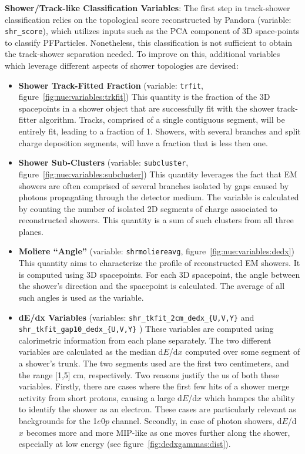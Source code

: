 \par \noindent \textbf{Shower/Track-like  Classification Variables}: The first step in track-shower classification relies on the topological score reconstructed by Pandora (variable: \texttt{shr\_score}), which utilizes inputs such as the PCA component of 3D space-points to classify PFParticles. Nonetheless, this classification is not sufficient to obtain the track-shower separation needed. To improve on this, additional variables which leverage different aspects of shower topologies are devised:

\begin{itemize}

    \item[] \textbf{Shower Track-Fitted Fraction} (variable: \texttt{trfit}, figure~\ref{fig:nue:variables:trkfit}) This quantity is the fraction of the 3D spacepoints in a shower object that are successfully fit with the shower track-fitter algorithm. Tracks, comprised of a single contiguous segment, will be entirely fit, leading to a fraction of 1. Showers, with several branches and split charge deposition segments, will have a fraction that is less then one.
    \item[] \textbf{Shower Sub-Clusters} (variable: \texttt{subcluster}, figure~\ref{fig:nue:variables:subcluster}) This quantity leverages the fact that EM showers are often comprised of several branches isolated by gaps caused by photons propagating through the detector medium. The variable is calculated by counting the number of isolated 2D segments of charge associated to reconstructed showers. This quantity is a sum of such clusters from all three planes.
    \item[] \textbf{Moliere ``Angle''} (variable: \texttt{shrmoliereavg}, figure~\ref{fig:nue:variables:dedx}) This quantity aims to characterize the profile of reconstructed EM showers. It is computed using 3D spacepoints. For each 3D spacepoint, the angle between the shower's direction and the spacepoint is calculated. The average of all such angles is used as the variable.
    \item[] \textbf{dE/dx Variables} (variables: \texttt{shr\_tkfit\_2cm\_dedx\_\{U,V,Y\}} and \texttt{shr\_tkfit\_gap10\_dedx\_\{U,V,Y\}} )  These variables are computed using calorimetric information from each plane separately. The two different variables are calculated as the median d$E$/d$x$ computed over some segment of a shower's trunk. The two segments used are the first two centimeters, and the range [1,5] cm, respectively. Two reasons justify the us of both these variables. Firstly, there are cases where the first few hits of a shower merge activity from short protons, causing a large d$E$/d$x$ which hampes the ability to identify the shower as an electron. These cases are particularly relevant as backgrounds for the 1$e$0$p$ channel. Secondly, in case of photon showers, d$E$/d$x$ becomes more and more MIP-like as one moves further along the shower, especially at low energy (see figure~\ref{fig:dedxgammas:dist}).
\end{itemize}{}

